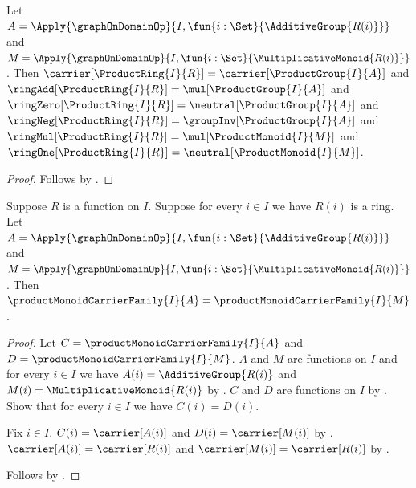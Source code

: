 \begin{proposition}\label{product_ring_fields}
    Let
        $A=\Apply{\graphOnDomainOp}{
            I,\fun{i:\Set}{\AdditiveGroup{R(i)}}}$ and
        $M=\Apply{\graphOnDomainOp}{
            I,\fun{i:\Set}{\MultiplicativeMonoid{R(i)}}}$.
    Then
        $\carrier[\ProductRing{I}{R}]=\carrier[\ProductGroup{I}{A}]$ and
        $\ringAdd[\ProductRing{I}{R}]=\mul[\ProductGroup{I}{A}]$ and
        $\ringZero[\ProductRing{I}{R}]=\neutral[\ProductGroup{I}{A}]$ and
        $\ringNeg[\ProductRing{I}{R}]=\groupInv[\ProductGroup{I}{A}]$ and
        $\ringMul[\ProductRing{I}{R}]=\mul[\ProductMonoid{I}{M}]$ and
        $\ringOne[\ProductRing{I}{R}]=\neutral[\ProductMonoid{I}{M}]$.
\end{proposition}
\begin{proof}
    Follows by
        .
\end{proof}

\begin{proposition}\label{product_ring_carrier_families_equal}
    Suppose $R$ is a function on $I$.
    Suppose for every $i\in I$ we have $R(i)$ is a ring.
    Let
        $A=\Apply{\graphOnDomainOp}{
            I,\fun{i:\Set}{\AdditiveGroup{R(i)}}}$ and
        $M=\Apply{\graphOnDomainOp}{
            I,\fun{i:\Set}{\MultiplicativeMonoid{R(i)}}}$.
    Then
        $\productMonoidCarrierFamily{I}{A}
            =\productMonoidCarrierFamily{I}{M}$.
\end{proposition}
\begin{proof}
    Let $C=\productMonoidCarrierFamily{I}{A}$ and
        $D=\productMonoidCarrierFamily{I}{M}$.
    $A$ and $M$ are functions on $I$ and
        for every $i\in I$ we have
            $A(i)=\AdditiveGroup{R(i)}$ and
            $M(i)=\MultiplicativeMonoid{R(i)}$ by
        .
    $C$ and $D$ are functions on $I$ by
        .
    Show that for every $i\in I$ we have $C(i)=D(i)$.
    \begin{subproof}
        Fix $i\in I$.
        $C(i)=\carrier[A(i)]$ and $D(i)=\carrier[M(i)]$ by
            .
        $\carrier[A(i)]=\carrier[R(i)]$ and
            $\carrier[M(i)]=\carrier[R(i)]$ by
            .
    \end{subproof}
    Follows by .
\end{proof}

